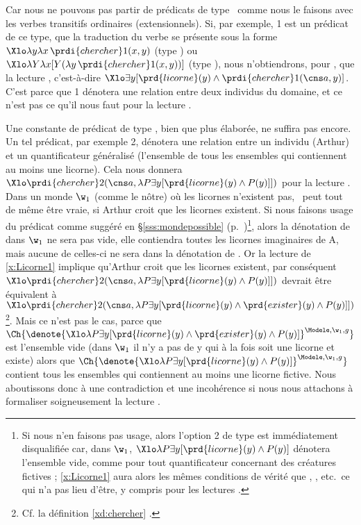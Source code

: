 Car nous ne pouvons pas partir de prédicats de type \eet\ comme nous le faisons avec les verbes transitifs ordinaires (extensionnels).  Si, par exemple, 1 est un prédicat de ce type, que la traduction du verbe se présente sous la forme \(\Xlo\lambda y\lambda x\,\prdi{chercher}1(x,y)\)  (type \eet) ou \(\Xlo\lambda Y\lambda x[Y(\lambda y\,\prdi{chercher}1(x,y))]\) (type \type{\ett,\et}), nous n'obtiendrons, pour \Last, que la lecture , c'est-à-dire
\(\Xlo\exists y[\prd{licorne}(y)\wedge\prdi{chercher}1(\cns a,y)]\).
C'est parce que 1 dénotera une relation entre deux individus du domaine, et ce n'est pas ce qu'il nous faut pour la lecture . 


Une constante de prédicat de type \type{\ett,\et}, bien que plus élaborée, ne suffira pas encore. Un tel prédicat, par exemple 2, dénotera une relation entre un individu (Arthur) et un quantificateur généralisé (l'ensemble de tous les ensembles qui contiennent au moins une licorne).  
Cela nous donnera \(\Xlo\prdi{chercher}2(\cns a,\lambda P\exists y[\prd{licorne}(y)\wedge P(y)]])\) pour la lecture .
Dans un monde $\w_1$ (comme le nôtre) où les licornes n'existent pas, \Last\ peut tout de même être vraie, si Arthur croit que les licornes existent. Si nous faisons usage du prédicat  comme suggéré en \S\ref{sss:mondepossible} (p.~\pageref{prd:exister})\footnote{Si nous n'en faisons pas usage, alors l'option 2 de type \type{\ett,\et} est immédiatement disqualifiée car, dans $\w_1$, $\Xlo\lambda P\exists y[\prd{licorne}(y)\wedge P(y)]$ dénotera l'ensemble vide, comme pour tout quantificateur concernant des créatures fictives ; \ref{x:Licorne1} aura alors les mêmes conditions de vérité que , , etc.\  ce qui n'a pas lieu d'être, y compris pour les lectures . },
alors la dénotation de  dans $\w_1$ ne sera pas vide, elle contiendra toutes les licornes imaginaires de \Unv A, mais aucune de celles-ci ne sera dans la dénotation de .  Or la lecture  de \ref{x:Licorne1} implique qu'Arthur croit que les licornes existent, par conséquent \(\Xlo\prdi{chercher}2(\cns a,\lambda P\exists y[\prd{licorne}(y)\wedge P(y)]])\) devrait être équivalent à \(\Xlo\prdi{chercher}2(\cns a,\lambda P\exists y[\prd{licorne}(y)\wedge \prd{exister}(y) \wedge P(y)]])\)\footnote{Cf. la définition \ref{xd:chercher} .}.  Mais ce n'est pas le cas, parce que \(\Ch{\denote{\Xlo\lambda P\exists y[\prd{licorne}(y)\wedge \prd{exister}(y) \wedge P(y)]}^{\Modele,\w_1,g}}\) est l'ensemble vide (dans $\w_1$ il n'y a pas de \vrb y qui à la fois soit une licorne et existe) alors que \(\Ch{\denote{\Xlo\lambda P\exists y[\prd{licorne}(y) \wedge P(y)]}^{\Modele,\w_1,g}}\) contient tous les ensembles qui contiennent au moins une licorne fictive.  Nous aboutissons donc à une contradiction et une incohérence si nous nous attachons à formaliser soigneusement la lecture .
